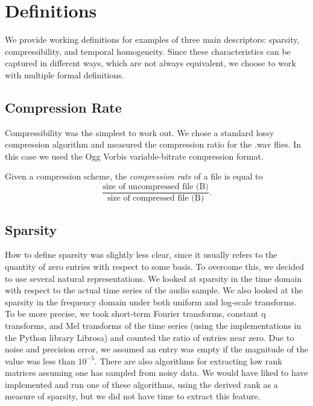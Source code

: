 \documentclass{sig-alternate-05-2015}
\let\realbfseries=\bfseries
\def\bfseries{\realbfseries\boldmath}
\newenvironment{definition}[1][Definition]{\begin{trivlist}
\item[\hskip \labelsep {\bfseries #1}]}{\end{trivlist}}
\begin{document}
\section{Definitions}
\label{sec:definitions}
We provide working definitions for examples of three main descriptors: sparsity, compressibility, and temporal homogeneity. Since these characteristics can be captured in different ways, which are not always equivalent, we choose to work with multiple formal definitions.

\subsection{Compression Rate}
Compressibility was the simplest to work out. We chose a standard lossy compression algorithm and measured the compression ratio for the .wav flies. In this case we used the Ogg Vorbis variable-bitrate compression format.

\begin{definition}
Given a compression scheme, the {\em compression rate} of a file is equal to \[\frac{\text{size of uncompressed file (B)}}{\text{size of compressed file (B)}}.\]  
\end{definition}

\subsection{Sparsity}

How to define sparsity was slightly less clear, since it usually refers to the quantity of zero entries with respect to some basis. To overcome this, we decided to use several natural representations. We looked at sparsity in the time domain with respect to the actual time series of the audio sample. We also looked at the sparsity in the frequency domain under both uniform and log-scale transforms. To be more precise, we took short-term Fourier transforms, constant q transforms, and Mel transforms of the time series (using the implementations in the Python library Librosa\cite{mcfee2015librosa}) and counted the ratio of entries near zero. Due to noise and precision error, we assumed an entry was empty if the magnitude of the value was less than $10^{-5}$. There are also algorithms for extracting low rank matrices assuming one has sampled from noisy data\cite{negahban2011estimation}. We would have liked to have implemented and run one of these algorithms, using the derived rank as a measure of sparsity, but we did not have time to extract this feature.
\end{document}
